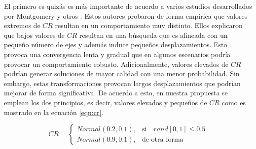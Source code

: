 %
El primero es quizás es más importante de acuerdo a varios estudios desarrollados por Montgomery y otros \cite{montgomery2010analysis}.
%
Estos autores probaron de forma empírica que valores extremos de $CR$ resultan en un comportamiento muy distinto.
%
Ellos explicaron que bajos valores de $CR$ resultan en una búsqueda que es alineada con un pequeño número de ejes y además induce pequeños desplazamientos.
%
Esto provoca una convergencia lenta y gradual que en algunos escenarios podría provocar un comportamiento robusto.
%
Adicionalmente, valores elevados de $CR$ podrían generar soluciones de mayor calidad con una menor probabilidad.
%
Sin embargo, estas transformaciones provocan largos desplazamientos que podrían mejorar de forma significativa.
%
De acuerdo a esto, en nuestra propuesta se emplean los dos principios, es decir, valores elevados y pequeños de $CR$ como es mostrado en la ecuación \ref{eqn:cr}.

\begin{equation} \label{eqn:cr}
CR = 
\begin{cases}
     Normal(0.2, 0.1),& \text{si} \quad rand[0,1] \leq 0.5  \\
     Normal(0.9, 0.1),              & \text{de otra forma}
\end{cases}
\end{equation}

